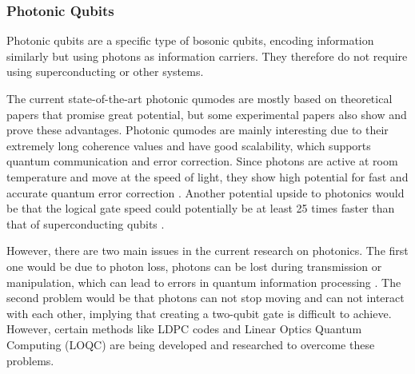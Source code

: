 \subsubsection{Photonic Qubits}


Photonic qubits are a specific type of bosonic qubits, encoding information similarly but using photons as information carriers. They therefore do not require using superconducting or other systems.

The current state-of-the-art photonic qumodes are mostly based on theoretical papers that promise great potential, but some experimental papers also show and prove these advantages. 
Photonic qumodes are mainly interesting due to their extremely long coherence values \cite{yan_silicon_2021} and have good scalability, which supports quantum communication and error correction. Since photons are active at room temperature and move at the speed of light, they show high potential for fast and accurate quantum error correction \cite{nourbakhsh_quantum_2022}. Another potential upside to photonics would be that the logical gate speed could potentially be at least 25 times faster than that of superconducting qubits \cite{tezrudolph_what_2023}. 

However, there are two main issues in the current research on photonics. The first one would be due to photon loss, photons can be lost during transmission or manipulation, which can lead to errors in quantum information processing \cite{noauthor_photonic_nodate}. The second problem would be that photons can not stop moving and can not interact with each other, implying that creating a two-qubit gate is difficult to achieve. However, certain methods like LDPC codes \cite{djordjevic_photonic_2009} and Linear Optics Quantum Computing (LOQC) \cite{noauthor_photonic_nodate} are being developed and researched to overcome these problems. 


